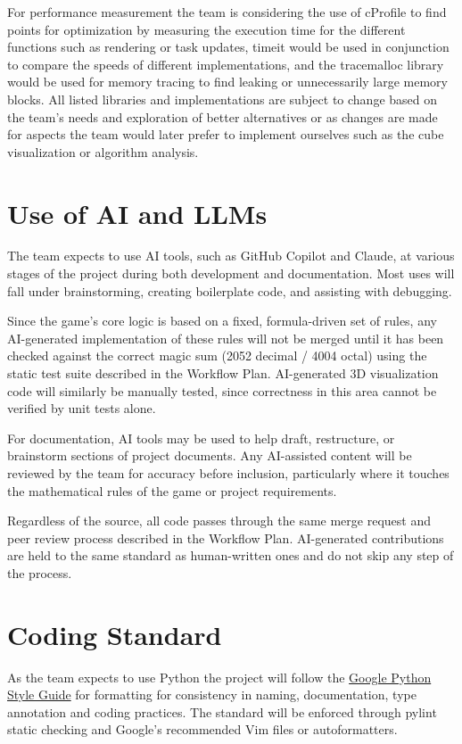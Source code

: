 \documentclass{article}
\begin{document}
 For performance measurement the team is considering the use of cProfile to find points for optimization by measuring the execution time for the different functions such as rendering or task updates, 
 timeit would be used in conjunction to compare the speeds of different implementations, and the tracemalloc library would be used for memory tracing to find leaking or unnecessarily large memory blocks. 
 All listed libraries and implementations are subject to change based on the team's needs and exploration of better alternatives or as changes are made for aspects the team would later prefer to implement ourselves such as the cube visualization or algorithm analysis.



\section{Use of AI and LLMs}

The team expects to use AI tools, such as GitHub Copilot and Claude, at various stages of the project during both development and documentation. Most uses will fall under brainstorming, creating boilerplate code, and assisting with debugging.

Since the game's core logic is based on a fixed, formula-driven set of rules, any AI-generated implementation of these rules will not be merged until it has been checked against the correct magic sum (2052 decimal / 4004 octal) using the static test suite described in the Workflow Plan. AI-generated 3D visualization code will similarly be manually tested, since correctness in this area cannot be verified by unit tests alone.

For documentation, AI tools may be used to help draft, restructure, or brainstorm sections of project documents. Any AI-assisted content will be reviewed by the team for accuracy before inclusion, particularly where it touches the mathematical rules of the game or project requirements.

Regardless of the source, all code passes through the same merge request and peer review process described in the Workflow Plan. AI-generated contributions are held to the same standard as human-written ones and do not skip any step of the process.

\section{Coding Standard}
As the team expects to use Python the project will follow the \href{https://google.github.io/styleguide/pyguide.html}{Google Python Style Guide} for formatting for consistency in naming, documentation, type annotation and coding practices. The standard will be enforced through pylint static checking and Google's recommended Vim files or autoformatters.
\end{document}
